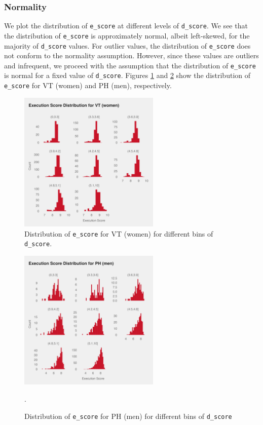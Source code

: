 \documentclass{article}
\begin{document}
\subsubsection{Normality}
We plot the distribution of \texttt{e\_score} at different levels of \texttt{d\_score}.
We see that the distribution of \texttt{e\_score} is approximately normal, albeit 
left-skewed, for the majority of \texttt{d\_score} values. For outlier values, 
the distribution of \texttt{e\_score} does not conform to the normality assumption. 
However, since these values are outliers and infrequent, we proceed with the assumption
that the distribution of \texttt{e\_score} is normal for a fixed value of \texttt{d\_score}.
Figures \ref{fig:fx_m_norm} and \ref{fig:ph_m_norm} show the distribution of \texttt{e\_score} 
for VT (women) and PH (men), respectively.
\begin{figure}[H]
    \centering
    \includegraphics[width=0.6\textwidth]{../plots//w_VT.png}
    \caption{Distribution of \texttt{e\_score} for VT (women) for different bins of \texttt{d\_score}.}
    \label{fig:fx_m_norm}
\end{figure}

\begin{figure}[H]
    \centering
    \includegraphics[width=0.6\textwidth]{../plots//m_PH.png}
    \caption{Distribution of \texttt{e\_score} for PH (men) for different bins of \texttt{d\_score}}.
    \label{fig:ph_m_norm}
\end{figure}
\end{document}
